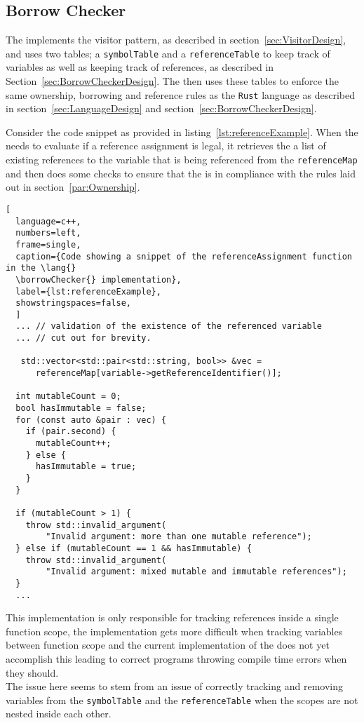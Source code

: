 \subsection{Borrow Checker}
\label{sec:BorrowCheckerImpl}

The \borrowChecker{} implements the visitor pattern, as described in
section~\ref{sec:VisitorDesign}, and uses two tables; a
\texttt{symbolTable} and a \texttt{referenceTable} to keep track of variables as well
as keeping track of references, as described in
Section~\ref{sec:BorrowCheckerDesign}. The \borrowChecker{} then uses these tables to enforce the
same ownership, borrowing and reference rules as the \texttt{Rust} language as described
in section~\ref{sec:LanguageDesign} and section~\ref{sec:BorrowCheckerDesign}. \\


Consider the code snippet as provided in listing~\ref{lst:referenceExample}. When the
\borrowChecker{} needs to evaluate if a reference assignment is legal, it retrieves
the a list of existing references to the variable that is being referenced from the
\texttt{referenceMap} and then does some checks to ensure that the \ast{} is in
compliance with the rules laid out in section~\ref{par:Ownership}.

\begin{lstlisting}[
  language=c++,
  numbers=left,
  frame=single,
  caption={Code showing a snippet of the referenceAssignment function in the \lang{}
  \borrowChecker{} implementation},
  label={lst:referenceExample},
  showstringspaces=false,
  ]
  ... // validation of the existence of the referenced variable 
  ... // cut out for brevity. 

   std::vector<std::pair<std::string, bool>> &vec =
      referenceMap[variable->getReferenceIdentifier()]; 

  int mutableCount = 0;
  bool hasImmutable = false;
  for (const auto &pair : vec) {
    if (pair.second) {
      mutableCount++;
    } else {
      hasImmutable = true;
    }
  }

  if (mutableCount > 1) {
    throw std::invalid_argument(
        "Invalid argument: more than one mutable reference");
  } else if (mutableCount == 1 && hasImmutable) {
    throw std::invalid_argument(
        "Invalid argument: mixed mutable and immutable references");
  }
  ...
\end{lstlisting}

This implementation is only responsible for tracking references inside a single
function scope, the implementation gets more difficult when tracking variables
between function scope and the current implementation of the \borrowChecker{} does
not yet accomplish this leading to correct programs throwing compile time errors when
they should. \\

The issue here seems to stem from an issue of correctly tracking and removing
variables from the \texttt{symbolTable} and the \texttt{referenceTable} when the
scopes are not nested inside each other.
